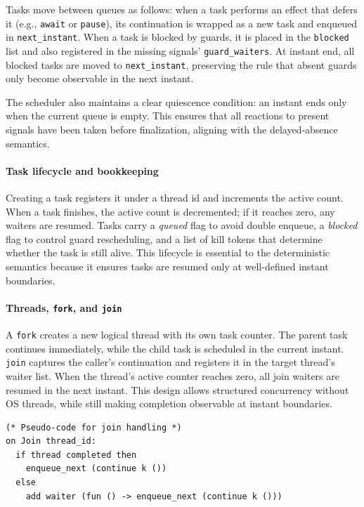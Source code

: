 Tasks move between queues as follows: when a task performs an effect that
defers it (e.g., \texttt{await} or \texttt{pause}), its continuation is wrapped
as a new task and enqueued in \texttt{next\_instant}. When a task is blocked by
guards, it is placed in the \texttt{blocked} list and also registered in the
missing signals' \texttt{guard\_waiters}. At instant end, all blocked tasks are
moved to \texttt{next\_instant}, preserving the rule that absent guards only
become observable in the next instant.

The scheduler also maintains a clear quiescence condition: an instant ends
only when the current queue is empty. This ensures that all reactions to
present signals have been taken before finalization, aligning with the
delayed-absence semantics.

\paragraph{Task lifecycle and bookkeeping}
Creating a task registers it under a thread id and increments the active count.
When a task finishes, the active count is decremented; if it reaches zero, any
waiters are resumed. Tasks carry a \emph{queued} flag to avoid double enqueue,
a \emph{blocked} flag to control guard rescheduling, and a list of kill tokens
that determine whether the task is still alive. This lifecycle is essential to
the deterministic semantics because it ensures tasks are resumed only at
well-defined instant boundaries.

\paragraph{Threads, \texttt{fork}, and \texttt{join}}
A \texttt{fork} creates a new logical thread with its own task counter. The
parent task continues immediately, while the child task is scheduled in the
current instant. \texttt{join} captures the caller's continuation and registers
it in the target thread's waiter list. When the thread's active counter reaches
zero, all join waiters are resumed in the next instant. This design allows
structured concurrency without OS threads, while still making completion
observable at instant boundaries.

\begin{lstlisting}[style=tempo]
(* Pseudo-code for join handling *)
on Join thread_id:
  if thread completed then
    enqueue_next (continue k ())
  else
    add waiter (fun () -> enqueue_next (continue k ()))
\end{lstlisting}

